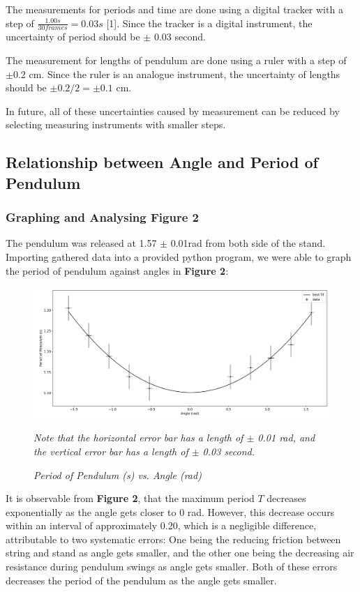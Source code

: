 \documentclass{article}
\begin{document}
 The measurements for periods and time are done using a digital tracker with a step of $ \frac{1.00 s}{30 frames}=0.03 s$ [1]. Since the tracker is a digital instrument, the uncertainty of period should be $\pm$ 0.03 second.
 
 The measurement for lengths of pendulum are done using a ruler with a step of $\pm$0.2 cm. Since the ruler is an analogue instrument, the uncertainty of lengths should be $\pm 0.2/2= \pm0.1$ cm.
 
 In future, all of these uncertainties caused by measurement can be reduced by selecting measuring instruments with smaller steps.


\subsection{Relationship between Angle and Period of Pendulum}

\subsubsection{Graphing and Analysing Figure 2}
The pendulum was released at 1.57 $\pm$ 0.01rad from both side of the stand. Importing gathered data into a provided python program, we were able to graph the period of pendulum against angles in \textbf{Figure 2}:

\begin{figure}[!htb]
	\includegraphics[scale=0.28]{fig_angle.png}
	\caption{\textit{Period of Pendulum (s) vs. Angle (rad)}}
	\center \textit{Note that the horizontal error bar has a length of $\pm$ 0.01 rad, and the vertical error bar has a length of $\pm$ 0.03 second. }

	\label{fig_angle}
\end{figure}

It is observable from \textbf{Figure 2}, that the maximum period $T$  decreases exponentially as the angle gets closer to 0 rad. However, this decrease occurs within an interval of approximately 0.20, which is a negligible difference, attributable to two systematic errors: One being the reducing friction between string and stand as angle gets smaller, and the other one being the decreasing air resistance during pendulum swings as angle gets smaller. Both of these errors decreases the period of the pendulum as the angle gets smaller.
\end{document}
